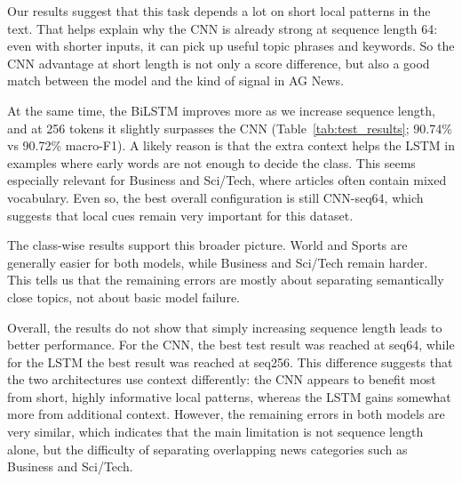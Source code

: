 Our results suggest that this task depends a lot on short local patterns in the text. That helps explain why the CNN is already strong at sequence length 64: even with shorter inputs, it can pick up useful topic phrases and keywords. So the CNN advantage at short length is not only a score difference, but also a good match between the model and the kind of signal in AG News.

At the same time, the BiLSTM improves more as we increase sequence length, and at 256 tokens it slightly surpasses the CNN (Table~\ref{tab:test_results}; 90.74\% vs 90.72\% macro-F1). A likely reason is that the extra context helps the LSTM in examples where early words are not enough to decide the class. This seems especially relevant for Business and Sci/Tech, where articles often contain mixed vocabulary. Even so, the best overall configuration is still CNN-seq64, which suggests that local cues remain very important for this dataset.

The class-wise results support this broader picture. World and Sports are generally easier for both models, while Business and Sci/Tech remain harder. This tells us that the remaining errors are mostly about separating semantically close topics, not about basic model failure.

Overall, the results do not show that simply increasing sequence length leads to better performance. For the CNN, the best test result was reached at seq64, while for the LSTM the best result was reached at seq256. This difference suggests that the two architectures use context differently: the CNN appears to benefit most from short, highly informative local patterns, whereas the LSTM gains somewhat more from additional context. However, the remaining errors in both models are very similar, which indicates that the main limitation is not sequence length alone, but the difficulty of separating overlapping news categories such as Business and Sci/Tech.

